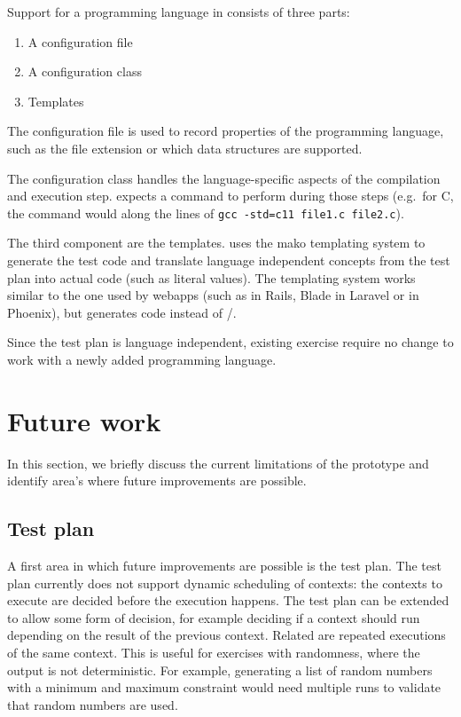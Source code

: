 \documentclass[5p,number]{elsarticle}
\begin{document}
    Support for a programming language in \tested{} consists of three parts:

    \begin{enumerate}
        \item A configuration file
        \item A configuration class
        \item Templates
    \end{enumerate}

    The configuration file is used to record properties of the programming language, such as the file extension or which data structures are supported.

    The configuration class handles the language-specific aspects of the compilation and execution step.
    \tested{} expects a command to perform during those steps (e.g.\ for C, the command would along the lines of \texttt{gcc -std=c11 file1.c file2.c}).

    The third component are the templates.
    \tested{} uses the mako templating system \cite{mako} to generate the test code and translate language independent concepts from the test plan into actual code (such as literal values).
    The templating system works similar to the one used by webapps (such as  in Rails, Blade in Laravel or  in Phoenix), but generates code instead of /.
    
    Since the test plan is language independent, existing exercise require no change to work with a newly added programming language.
    
    \section{Future work}\label{sec:future-work}
    
    In this section, we briefly discuss the current limitations of the prototype and identify area's where future improvements are possible.
    
    \subsection{Test plan}\label{subsec:test-plan}

    A first area in which future improvements are possible is the test plan.
    The test plan currently does not support dynamic scheduling of contexts: the contexts to execute are decided before the execution happens.
    The test plan can be extended to allow some form of decision, for example deciding if a context should run depending on the result of the previous context.
    Related are repeated executions of the same context.
    This is useful for exercises with randomness, where the output is not deterministic.
    For example, generating a list of random numbers with a minimum and maximum constraint would need multiple runs to validate that random numbers are used.
    
\end{document}
